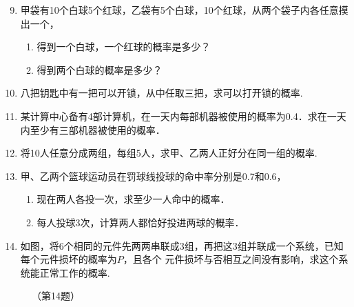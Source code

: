 \begin{enumerate}
   \setcounter{enumi}{8} 
\item 甲袋有10个白球5个红球，乙袋有5个白球，10个红球，从两个袋子内各任意摸出一个，
\begin{enumerate}[(1)]
    \item 得到一个白球，一个红球的概率是多少？
    \item 得到两个白球的概率是多少？
\end{enumerate}
\item 八把钥匙中有一把可以开锁，从中任取三把，求可以打开锁的概率.
\item 某计算中心备有4部计算机，在一天内每部机器被使用的概率为0.4．求在一天内至少有三部机器被使用的概率．
\item 将10人任意分成两组，每组5人，求甲、乙两人正好分在同一组的概率.
\item 甲、乙两个篮球运动员在罚球线投球的命中率分别是0.7和0.6，
\begin{enumerate}[(1)]
    \item 现在两人各投一次，求至少一人命中的概率．
    \item 每人投球3次，计算两人都恰好投进两球的概率．
\end{enumerate}
\item 如图，将6个相同的元件先两两串联成3组，再把这3组并联成一个系统，已知每个元件损坏的概率为$P$，且各个
元件损坏与否相互之间没有影响，求这个系统能正常工作的概率.   
\end{enumerate}

\begin{figure}[htp]
    \centering
{}
    \caption*{（第14题）}
\end{figure}

































